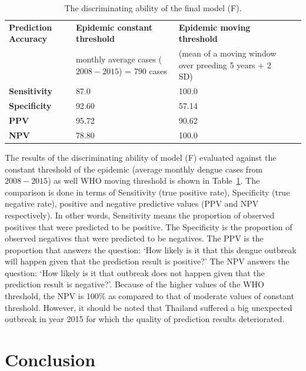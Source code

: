 \documentclass{bmcart}
\begin{document}
\begin{table}
	\centering
	\label{my-label}
	\begin{tabular}{|l|p{4.0cm}|p{4.0cm}|ll}
		\hline
		\textbf{Prediction Accuracy} & \textbf{Epidemic constant threshold}  & \textbf{Epidemic moving threshold} \\
		& monthly average cases ($2008-2015$) = 790 cases  & (mean of a moving window over preeding 5 years + 2 SD) \\  \cline{1-3}
		\textbf{Sensitivity} & 87.0  & 100.0  \\ 
		\textbf{Specificity} & 92.60 &  57.14  \\ 
		\textbf{PPV} & 95.72 &  90.62         \\ 
		\textbf{NPV} & 78.80  &  100.0        \\\cline{1-3}
	\end{tabular}
	\caption{The discriminating ability of the final model (F).} 
	\label{tab:resultsBinary}
\end{table}

The  results of the discriminating ability of model (F) evaluated against the constant threshold of the epidemic (average monthly dengue cases from $2008-2015$) as well WHO moving threshold is shown in Table~\ref{tab:resultsBinary}. The comparison is done in terms of Sensitivity (true positive rate), Specificity (true negative rate), positive and negative predictive values (PPV and NPV respectively).  In other words, Sensitivity means the proportion of observed positives that were predicted to be positive. The Specificity is the proportion of observed negatives that were predicted to be negatives. The PPV is the proportion that answers the question: `How likely is it that this dengue outbreak will happen given that the prediction result is positive?' The NPV answers the question: `How likely is it that outbreak does not happen given that the prediction result is negative?'. Because of the higher values of the WHO threshold, the NPV is 100\% as compared to that of moderate values of constant threshold. However, it should be noted that Thailand suffered a big unexpected outbreak in year 2015 for which the quality of prediction results deteriorated.




\section{Conclusion} \label{discussion}
\end{document}
